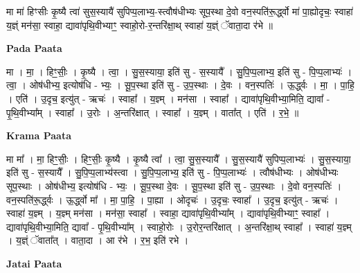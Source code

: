 \documentclass[17pt]{extarticle}
\begin{document}
मा मा॑ हिꣳसीः कृ॒ष्यै त्वा॑ सुस॒स्यायै॑ सुपिप्प॒लाभ्य॒-स्त्वौष॑धीभ्यः सूप॒स्था दे॒वो वन॒स्पति॑रू॒र्द्ध्वो मा॑ पा॒ह्योदृचः॒ स्वाहा॑ य॒ज्ञ्ं मन॑सा॒ स्वाहा॒ द्यावा॑पृथि॒वीभ्याꣳ॒॒ स्वाहो॒रो-र॒न्तरि॑क्षा॒थ् स्वाहा॑ य॒ज्ञ्ं ॅवाता॒दा र॑भे ॥ \newline

\textbf{Pada Paata} \newline

मा । मा॒ । हिꣳ॒॒सीः॒ । कृ॒ष्यै । त्वा॒ । सु॒स॒स्याया॒ इति॑ सु - स॒स्यायै᳚ । सु॒पि॒प्प॒लाभ्य॒ इति॑ सु - पि॒प्प॒लाभ्यः॑ । त्वा॒ । ओष॑धीभ्य॒ इत्योष॑धि - भ्यः॒ । सू॒प॒स्था इति॑ सु - उ॒प॒स्थाः । दे॒वः । वन॒स्पतिः॑ । ऊ॒र्द्ध्वः । मा॒ । पा॒हि॒ । एति॑ । उ॒दृच॒ इत्यु॑त् - ऋचः॑ । स्वाहा᳚ । य॒ज्ञ्म् । मन॑सा । स्वाहा᳚ । द्यावा॑पृथि॒वीभ्या॒मिति॒ द्यावा᳚ - पृ॒थि॒वीभ्या᳚म् । स्वाहा᳚ । उ॒रोः । अ॒न्तरि॑क्षात् । स्वाहा᳚ । य॒ज्ञ्म् । वाता᳚त् । एति॑ । र॒भे॒ ॥  \newline


\textbf{Krama Paata} \newline

मा मा᳚ । मा॒ हिꣳ॒॒सीः॒ । हिꣳ॒॒सीः॒ कृ॒ष्यै । कृ॒ष्यै त्वा᳚ । त्वा॒ सु॒स॒स्यायै᳚ । सु॒स॒स्यायै॑ सुपिप्प॒लाभ्यः॑ । सु॒स॒स्याया॒ इति॑ सु - स॒स्यायै᳚ । सु॒पि॒प्प॒लाभ्य॑स्त्वा । सु॒पि॒प्प॒लाभ्य॒ इति॑ सु - पि॒प्प॒लाभ्यः॑ । त्वौष॑धीभ्यः । ओष॑धीभ्यः सूप॒स्थाः । ओष॑धीभ्य॒ इत्योष॑धि - भ्यः॒ । सू॒प॒स्था दे॒वः । सू॒प॒स्था इति॑ सु - उ॒प॒स्थाः । दे॒वो वन॒स्पतिः॑ । वन॒स्पति॑रू॒र्द्ध्वः । 
ऊ॒र्द्ध्वो मा᳚ । मा॒ पा॒हि॒ । पा॒ह्या । ओदृचः॑ । उ॒दृचः॒ स्वाहा᳚ । उ॒दृच॒ इत्यु॑त् - ऋचः॑ । स्वाहा॑ य॒ज्ञ्म् । य॒ज्ञ्म् मन॑सा । मन॑सा॒ स्वाहा᳚ । स्वाहा॒ द्यावा॑पृथि॒वीभ्या᳚म् । द्यावा॑पृथि॒वीभ्याꣳ॒॒ 
स्वाहा᳚ । द्यावा॑पृथि॒वीभ्या॒मिति॒ द्यावा᳚ - पृ॒थि॒वीभ्या᳚म् । स्वाहो॒रोः । उ॒रोर॒न्तरि॑क्षात् । अ॒न्तरि॑क्षा॒थ् स्वाहा᳚ । स्वाहा॑ य॒ज्ञ्म् । य॒ज्ञ्ं ॅवाता᳚त् । वाता॒दा । आ र॑भे । र॒भ॒ इति॑ रभे । \newline

\textbf{Jatai Paata} \newline
\end{document}
